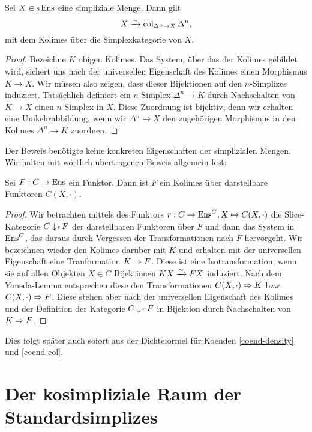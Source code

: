 \begin{lemma} \label{sset-col}
  Sei $X \in \operatorname{s}\operatorname{Ens}$ eine simpliziale Menge. Dann gilt
  \[ X \xrightarrow[]{\sim} \operatorname{col}_{\Delta^n \to X} \Delta^n, \]
  mit dem Kolimes über die Simplexkategorie von $X$.
\end{lemma}
\begin{proof}
  Bezeichne $K$ obigen Kolimes. Das System, über das der Kolimes
  gebildet wird, sichert uns nach der universellen Eigenschaft des
  Kolimes einen Morphismus $K \to X$. Wir müssen also zeigen, dass
  dieser Bijektionen auf den $n$-Simplizes induziert. Tatsächlich
  definiert ein $n$-Simplex $\Delta^n \to K$ durch Nachschalten von
  $K \to X$ einen $n$-Simplex in $X$. Diese Zuordnung ist bijektiv,
  denn wir erhalten eine Umkehrabbildung, wenn wir $\Delta^n \to X$
  den zugehörigen Morphismus in den Kolimes $\Delta^n \to K$ zuordnen.
\end{proof}
Der Beweis benötigte keine konkreten Eigenschaften der simplizialen
Mengen. Wir halten mit wörtlich übertragenen Beweis allgemein fest:
\begin{prop} \label{presheaf-colimit-representable}
  Sei $F: C \to \operatorname{Ens}$ ein Funktor. Dann ist $F$ ein Kolimes über
  darstellbare Funktoren $C(X, \cdot)$.
\end{prop}
\begin{proof}
  Wir betrachten mittels des Funktors $r: C \to \operatorname{Ens}^C, X \mapsto
  C(X, \cdot)$ die Slice-Kategorie $C \downarrow \! {\scriptstyle r} \, F$ der
  darstellbaren Funktoren über $F$ und dann das System in $\operatorname{Ens}^C$,
  das daraus durch Vergessen der Transformationen nach $F$
  hervorgeht. Wir bezeichnen wieder den Kolimes darüber mit $K$ und
  erhalten mit der universellen Eigenschaft eine Tranformation
  $K \Rightarrow F$. Diese ist eine Isotransformation, wenn sie auf allen
  Objekten $X \in C$ Bijektionen $KX \xrightarrow[]{\sim} FX$ induziert. Nach dem
  Yoneda-Lemma entsprechen diese den Transformationen
  $C(X, \cdot) \Rightarrow K$ bzw. $C(X, \cdot) \Rightarrow F$. Diese stehen
  aber nach der universellen Eigenschaft des Kolimes und der
  Definition der Kategorie $C \downarrow \! {\scriptstyle r} \, F$ in Bijektion durch
  Nachschalten von $K \Rightarrow F$.
\end{proof}
\begin{bem}
  Dies folgt später auch sofort aus der Dichteformel für Koenden
  \ref{coend-density} und \ref{coend-col}.
\end{bem}

\section{Der kosimpliziale Raum der Standardsimplizes}

